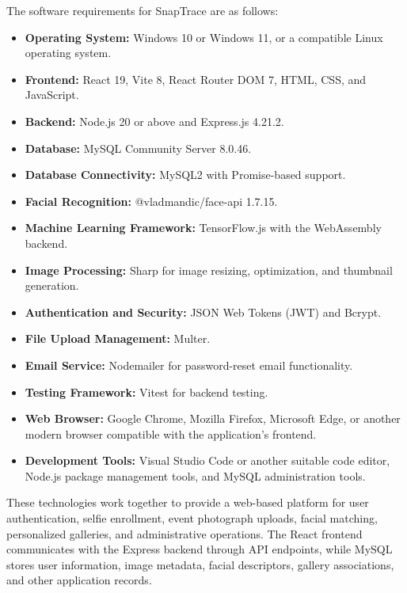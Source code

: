 The software requirements for SnapTrace are as follows:
\begin{itemize}
    \item \textbf{Operating System:} Windows 10 or Windows 11, or a compatible Linux operating system.
    \item \textbf{Frontend:} React 19, Vite 8, React Router DOM 7, HTML, CSS, and JavaScript.
    \item \textbf{Backend:} Node.js 20 or above and Express.js 4.21.2.
    \item \textbf{Database:} MySQL Community Server 8.0.46.
    \item \textbf{Database Connectivity:} MySQL2 with Promise-based support.
    \item \textbf{Facial Recognition:} @vladmandic/face-api 1.7.15.
    \item \textbf{Machine Learning Framework:} TensorFlow.js with the WebAssembly backend.
    \item \textbf{Image Processing:} Sharp for image resizing, optimization, and thumbnail generation.
    \item \textbf{Authentication and Security:} JSON Web Tokens (JWT) and Bcrypt.
    \item \textbf{File Upload Management:} Multer.
    \item \textbf{Email Service:} Nodemailer for password-reset email functionality.
    \item \textbf{Testing Framework:} Vitest for backend testing.
    \item \textbf{Web Browser:} Google Chrome, Mozilla Firefox, Microsoft Edge, or another modern browser compatible with the application's frontend.
    \item \textbf{Development Tools:} Visual Studio Code or another suitable code editor, Node.js package management tools, and MySQL administration tools.
\end{itemize}
These technologies work together to provide a web-based platform for user authentication, selfie enrollment, event photograph uploads, facial matching, personalized galleries, and administrative operations. The React frontend communicates with the Express backend through API endpoints, while MySQL stores user information, image metadata, facial descriptors, gallery associations, and other application records.



